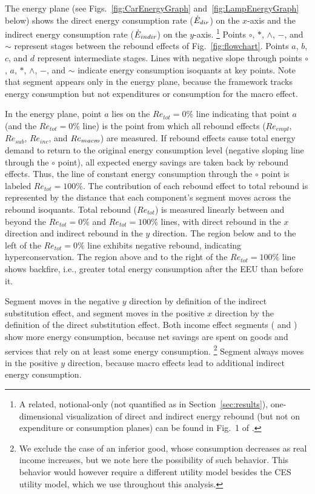 \documentclass[12pt]{article}\usepackage[]{graphicx}\usepackage[]{xcolor}
\begin{document}
The energy plane
(see Figs.~\ref{fig:CarEnergyGraph} and~\ref{fig:LampEnergyGraph} below)
shows the direct energy consumption rate ($\dot{E}_{dir}$) on the $x$-axis
and
the indirect energy consumption rate ($\dot{E}_{indir}$) on the $y$-axis.%
\footnote{
  A related, notional-only (not quantified as in Section~\ref{sec:results}),
  one-dimensional visualization of direct and indirect energy rebound
  (but not on expenditure or consumption planes)
  can be found in Fig.~1 of \cite{Exadaktylos:2021aa}.}
%
Points $\circ$, $*$, $\wedge$, $-$, and $\sim$ represent stages
between the rebound effects of Fig.~\ref{fig:flowchart}.
Points $a$, $b$, $c$, and $d$ represent intermediate stages.
Lines with negative slope through points
$\circ$, $a$, $*$, $\wedge$, $-$, and $\sim$
indicate energy consumption isoquants
at key points.
Note that segment \bartilde{} appears only in the energy plane,
because the framework tracks energy consumption but not expenditures or consumption
for the macro effect.

In the energy plane,
point $a$ lies on the $Re_{tot} = 0\%$ line
indicating that point $a$ (and the $Re_{tot} = 0\%$ line)
is the point from which all rebound effects
($Re_{empl}$, $Re_{sub}$, $Re_{inc}$, and $Re_{macr\!o}$)
are measured.
If rebound effects cause
total energy demand to return to the original energy consumption level
(negative sloping line through the $\circ$ point),
all expected energy savings are taken back by rebound effects.
Thus, the line of constant energy consumption through the $\circ$ point is labeled
$Re_{tot} = 100\%$.
The contribution of each rebound effect to total rebound
is represented by the distance that each component's segment
moves across the rebound isoquants.
Total rebound ($Re_{tot}$) is measured linearly between and beyond the
$Re_{tot} = 0\%$ and $Re_{tot} = 100\%$ lines,
with direct rebound in the $x$ direction and
indirect rebound in the $y$ direction.
The region below and to the left of the $Re_{tot} = 0\%$ line
exhibits negative rebound, indicating hyperconservation.
The region above and to the right of the $Re_{tot} = 100\%$ line
shows backfire,
i.e., greater total energy consumption after the EEU than before it.

Segment \starc{} moves in the negative $y$ direction
by definition of the indirect substitution effect,
and segment \chat{} moves in the positive $x$ direction
by the definition of the direct substitution effect.
Both income effect segments (\hatd{} and \dbar{})
show more energy consumption, because net savings are spent
on goods and services that rely on at least some energy consumption.%
\footnote{
  We exclude the case of an inferior good, whose consumption decreases
  as real income increases, but
  we note here the possibility of such behavior.
  This behavior would
  however require a different utility model
  besides the CES utility model,
  which we use throughout this analysis.
}
%
Segment \bartilde{} always moves in the positive $y$ direction,
because macro effects lead to additional indirect energy consumption.
\end{document}
